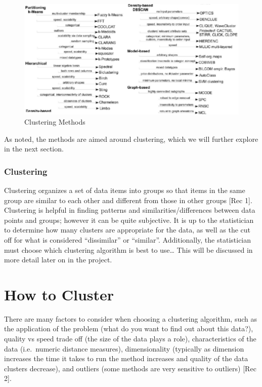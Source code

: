 \documentclass[12pt,twoside]{amherstthesis}
\begin{document}
  \begin{figure}[htbp]
  \centering
  \includegraphics[scale = 0.5,angle = 0]{clustering_methods.png}
  \caption[Clustering Methods]{\normalsize{Clustering Methods}}
  \label{fig:Clustering}
  \end{figure}
  
  As noted, the methods are aimed around clustering, which we will further
  explore in the next section.
  
  \subsection{Clustering}\label{clustering}
  
  Clustering organizes a set of data items into groups so that items in
  the same group are similar to each other and different from those in
  other groups {[}Rec 1{]}. Clustering is helpful in finding patterns and
  similarities/differences between data points and groups; however it can
  be quite subjective. It is up to the statistician to determine how many
  clusters are appropriate for the data, as well as the cut off for what
  is considered ``dissimilar'' or ``similar''. Additionally, the
  statistician must choose which clustering algorithm is best to
  use\ldots{} This will be discussed in more detail later on in the
  project.
  
  \chapter{How to Cluster}\label{rmd-basics}
  
  There are many factors to consider when choosing a clustering algorithm,
  such as the application of the problem (what do you want to find out
  about this data?), quality vs speed trade off (the size of the data
  plays a role), characteristics of the data (i.e.~numeric distance
  measures), dimensionality (typically as dimension increases the time it
  takes to run the method increases and quality of the data clusters
  decrease), and outliers (some methods are very sensitive to outliers)
  {[}Rec 2{]}.
  
\end{document}
